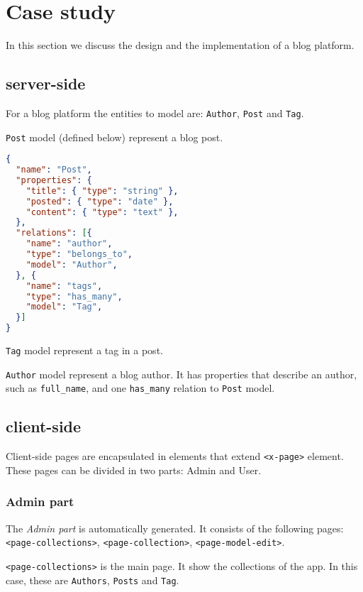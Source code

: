 \section{Case study}\label{sec:case-study}
In this section we discuss the design and the implementation of a blog platform. 

\subsection{server-side}
For a blog platform the entities to model are: \texttt{Author}, \texttt{Post} and \texttt{Tag}.

\texttt{Post} model (defined below) represent a blog post.

\begin{lstlisting}[language=json]
{
  "name": "Post",
  "properties": {
    "title": { "type": "string" },
    "posted": { "type": "date" },
    "content": { "type": "text" },
  }, 
  "relations": [{ 
    "name": "author", 
    "type": "belongs_to",
    "model": "Author",
  }, {
    "name": "tags", 
    "type": "has_many",
    "model": "Tag",
  }]
}
\end{lstlisting}

\texttt{Tag} model represent a tag in a post.

\texttt{Author} model represent a blog author. It has properties that describe an author, such as \texttt{full\_name}, and one \texttt{has\_many} relation to \texttt{Post} model.

  
\subsection{client-side}
Client-side pages are encapsulated in elements that extend \texttt{<x-page>} element. These pages can be divided in two parts: Admin and User.

\subsubsection{Admin part}
The \emph{Admin part} is automatically generated. 
It consists of the following pages: \texttt{<page-collections>}, \texttt{<page-collection>}, \texttt{<page-model-edit>}.

\vspace{0.2cm}

\texttt{<page-collections>} is the main page. It show the collections of the app. In this case, these are \texttt{Authors}, \texttt{Posts} and \texttt{Tag}.

